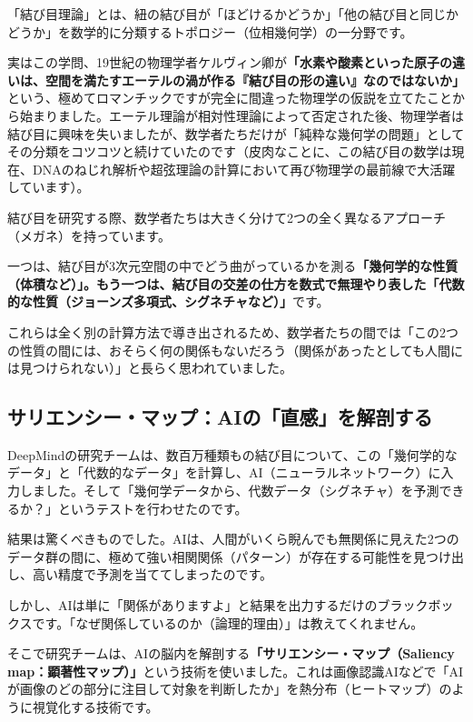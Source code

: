 「結び目理論」とは、紐の結び目が「ほどけるかどうか」「他の結び目と同じかどうか」を数学的に分類するトポロジー（位相幾何学）の一分野です。

実はこの学問、19世紀の物理学者ケルヴィン卿が\textbf{「水素や酸素といった原子の違いは、空間を満たすエーテルの渦が作る『結び目の形の違い』なのではないか」}という、極めてロマンチックですが完全に間違った物理学の仮説を立てたことから始まりました。エーテル理論が相対性理論によって否定された後、物理学者は結び目に興味を失いましたが、数学者たちだけが「純粋な幾何学の問題」としてその分類をコツコツと続けていたのです（皮肉なことに、この結び目の数学は現在、DNAのねじれ解析や超弦理論の計算において再び物理学の最前線で大活躍しています）。

結び目を研究する際、数学者たちは大きく分けて2つの全く異なるアプローチ（メガネ）を持っています。

一つは、結び目が3次元空間の中でどう曲がっているかを測る\textbf{「幾何学的な性質（体積など）」。もう一つは、結び目の交差の仕方を数式で無理やり表した「代数的な性質（ジョーンズ多項式、シグネチャなど）」}です。

これらは全く別の計算方法で導き出されるため、数学者たちの間では「この2つの性質の間には、おそらく何の関係もないだろう（関係があったとしても人間には見つけられない）」と長らく思われていました。

\subsection{サリエンシー・マップ：AIの「直感」を解剖する}

DeepMindの研究チームは、数百万種類もの結び目について、この「幾何学的なデータ」と「代数的なデータ」を計算し、AI（ニューラルネットワーク）に入力しました。そして「幾何学データから、代数データ（シグネチャ）を予測できるか？」というテストを行わせたのです。

結果は驚くべきものでした。AIは、人間がいくら睨んでも無関係に見えた2つのデータ群の間に、極めて強い相関関係（パターン）が存在する可能性を見つけ出し、高い精度で予測を当ててしまったのです。

しかし、AIは単に「関係がありますよ」と結果を出力するだけのブラックボックスです。「なぜ関係しているのか（論理的理由）」は教えてくれません。

そこで研究チームは、AIの脳内を解剖する\textbf{「サリエンシー・マップ（Saliency map：顕著性マップ）」}という技術を使いました。これは画像認識AIなどで「AIが画像のどの部分に注目して対象を判断したか」を熱分布（ヒートマップ）のように視覚化する技術です。

